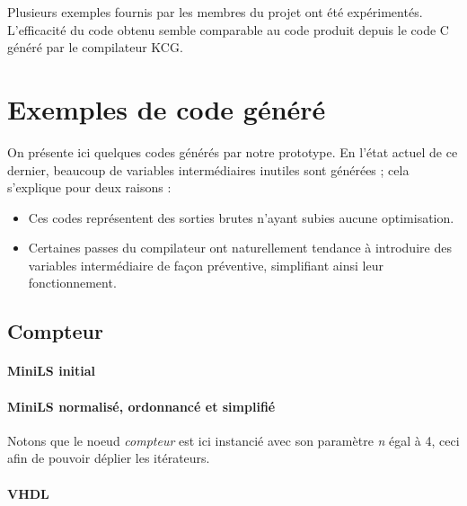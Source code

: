 \documentclass[a4paper]{article}
\begin{document}
Plusieurs exemples fournis par les membres du projet ont \'et\'e
exp\'eriment\'es. L'efficacit\'e du code obtenu semble comparable au code
produit depuis le code C g\'en\'er\'e par le compilateur KCG.

\newpage
\tableofcontents

\newpage



\newpage
\appendix


\section{Exemples de code g\'en\'er\'e}

On pr\'esente ici quelques codes g\'en\'er\'es par notre prototype. En l'\'etat
actuel de ce dernier, beaucoup de variables interm\'ediaires inutiles sont
g\'en\'er\'ees ; cela s'explique pour deux raisons :

\begin{itemize}
\item Ces codes repr\'esentent des sorties brutes n'ayant subies aucune
  optimisation.
\item Certaines passes du compilateur ont naturellement tendance \`a introduire
  des variables interm\'ediaire de fa\c{c}on pr\'eventive, simplifiant ainsi leur
  fonctionnement.
\end{itemize}

\subsection{Compteur}

\paragraph{MiniLS initial}

\small

\normalsize

\paragraph{MiniLS normalis\'e, ordonnanc\'e et simplifi\'e}

Notons que le noeud \textit{compteur} est ici instanci\'e avec son param\`etre
\textit{n} \'egal \`a 4, ceci afin de pouvoir d\'eplier les it\'erateurs.

\small

\normalsize

\paragraph{VHDL}
\end{document}
